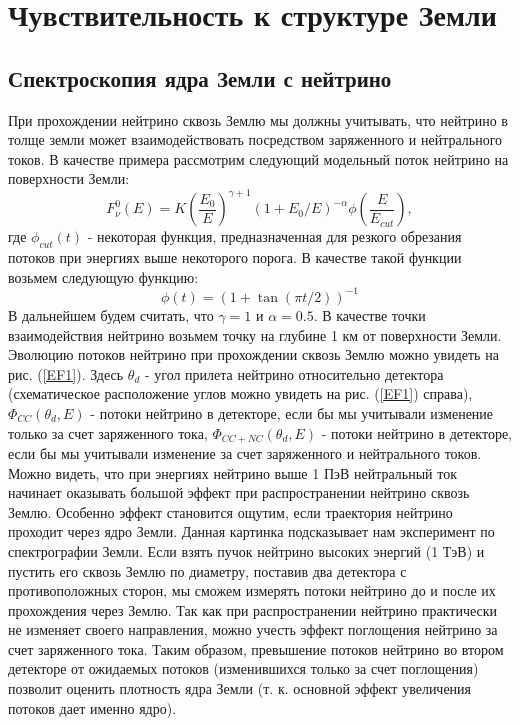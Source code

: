 \section{Чувствительность к структуре Земли}
\subsection{Спектроскопия ядра Земли с нейтрино}
При прохождении нейтрино сквозь Землю мы должны учитывать, что нейтрино в толще земли может взаимодействовать посредством заряженного и нейтрального токов. В качестве примера рассмотрим следующий модельный поток нейтрино на поверхности Земли: 
\begin{equation}
    F_{\nu}^{0}(E) = K\left(\frac{E_0}{E}\right)^{\gamma+1} (1+E_0/E)^{-\alpha}\phi\left(\frac{E}{E_{cut}}\right),
\end{equation}
где $\phi_{cut}(t)$ - некоторая функция, предназначенная для резкого обрезания потоков при энергиях выше некоторого порога. В качестве такой функции возьмем следующую функцию:
\begin{equation}
    \phi(t) = (1+\tan(\pi t/2))^{-1}
\end{equation}
В дальнейшем будем считать, что $\gamma = 1$ и $\alpha = 0.5$.
В качестве точки взаимодействия нейтрино возьмем точку на глубине 1 км от поверхности Земли. Эволюцию потоков нейтрино при прохождении сквозь Землю можно увидеть на рис. (\ref{EF1}). Здесь $\theta_d$ - угол прилета нейтрино относительно детектора (схематическое расположение углов можно увидеть на рис. (\ref{EF1}) справа), $\Phi_{CC}(\theta_d, E)$  - потоки нейтрино в детекторе, если бы мы учитывали изменение только за счет заряженного тока, $\Phi_{CC+NC}(\theta_d, E)$  - потоки нейтрино в детекторе, если бы мы учитывали изменение за счет заряженного и нейтрального токов. Можно видеть, что при энергиях нейтрино выше 1 ПэВ нейтральный ток начинает оказывать большой эффект при распространении нейтрино сквозь Землю. Особенно эффект становится ощутим, если траектория нейтрино проходит через ядро Земли. Данная картинка подсказывает нам эксперимент по спектрографии Земли. Если взять пучок нейтрино высоких энергий (1 ТэВ) и пустить его сквозь Землю по диаметру, поставив два детектора с противоположных сторон, мы сможем измерять потоки нейтрино до и после их прохождения через Землю. Так как при распространении нейтрино практически не изменяет своего направления, можно учесть эффект поглощения нейтрино за счет заряженного тока. Таким образом, превышение потоков нейтрино во втором детекторе от ожидаемых потоков (изменившихся только за счет поглощения) позволит оценить плотность ядра Земли (т. к. основной эффект увеличения потоков дает именно ядро).   
